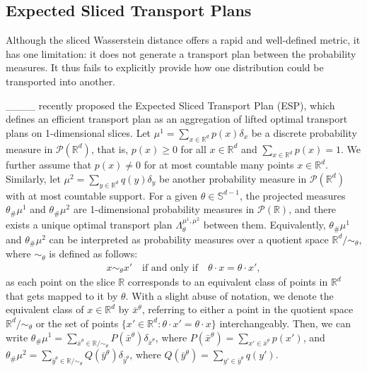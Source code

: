 \subsection{Expected Sliced Transport Plans}
Although the sliced Wasserstein distance offers a rapid and well-defined metric, it has one limitation: it does not generate a transport plan between the probability measures. It thus fails to explicitly provide how one distribution could be transported into another. 

____ recently proposed the Expected Sliced Transport Plan (ESP), which defines an efficient transport plan as an aggregation of lifted optimal transport plans on 1-dimensional slices. Let $\mu^1=\sum_{x\in\mathbb{R}^d}p(x)\delta_x$ be a discrete probability measure in $\mathcal{P}(\mathbb{R}^d)$, that is, $p(x)\geq 0$ for all $x\in\mathbb{R}^d$ and $\sum_{x\in\mathbb{R}^d}p(x)=1$. We further assume that $p(x)\neq 0$ for at most countable many points $x\in\mathbb{R}^d$. Similarly, let $\mu^2=\sum_{y\in\mathbb{R}^d}q(y)\delta_y$ be another probability measure in $\mathcal{P}(\mathbb{R}^d)$ with at most countable support. For a given $\theta\in\mathbb{S}^{d-1}$, the projected measures $\theta_{\#}\mu^1$ and $\theta_{\#}\mu^2$ are 1-dimensional probability measures in $\mathcal{P}(\mathbb{R})$, and there exists a unique optimal transport plan $\Lambda_\theta^{\mu^1, \mu^2}$ between them. Equivalently, $\theta_{\#}\mu^1$ and $\theta_{\#}\mu^2$ can be interpreted as probability measures over a quotient space $\mathbb{R}^d/\sim_\theta$, where $\sim_\theta$ is defined as follows:
\vspace{-.05in}
\begin{align*}
    x\sim_\theta x'\quad\text{if and only if}\quad\theta\cdot x=\theta \cdot x',
\end{align*}
as each point on the slice $\mathbb{R}$ corresponds to an equivalent class of points in $\mathbb{R}^d$ that gets mapped to it by $\theta$. With a slight abuse of notation, we denote the equivalent class of $x\in\mathbb{R}^d$ by $\bar{x}^\theta$, referring to either a point in the quotient space $\mathbb{R}^d/\sim_\theta$ or the set of points $\{x'\in\mathbb{R}^d:\theta\cdot x'=\theta\cdot x\}$ interchangeably. Then, we can write $\theta_\# \mu^1=\sum_{\bar{x}^\theta\in\mathbb{R}/\sim_\theta}P(\bar{x}^\theta)\delta_{\bar{x}^\theta}$, where $P(\bar{x}^\theta)=\sum_{x'\in\bar{x}^\theta}p(x')$, and $\theta_\# \mu^2=\sum_{\bar{y}^\theta\in\mathbb{R}/\sim_\theta}Q(\bar{y}^\theta)\delta_{\bar{y}^\theta}$, where $Q(\bar{y}^\theta)=\sum_{y'\in\bar{y}^\theta}q(y')$. 

